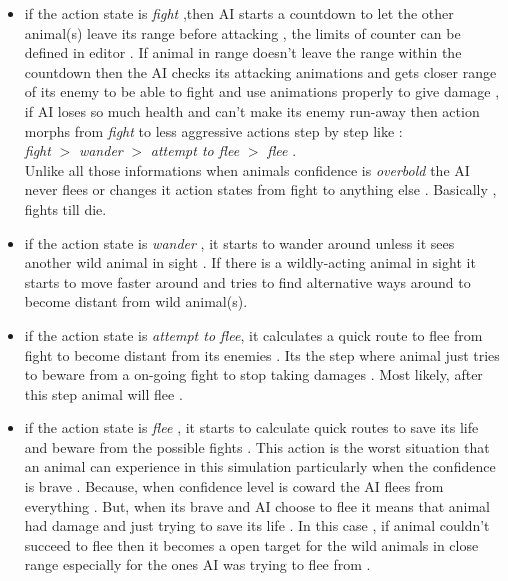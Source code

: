 \begin{itemize}
    \item if the action state is \textit{fight} ,then AI starts a countdown to let the other animal(s) leave its range before attacking , the limits of counter can be defined in editor  . If animal in range doesn't leave the range within the countdown then the AI checks its attacking animations and gets closer range of its enemy to be able to fight and use  animations properly to give damage , if AI loses so much health and can't make its enemy run-away then action morphs from \textit{fight} to less aggressive actions step by step like :\\
    
    \textit{fight} $>$   \textit{wander}  $>$ \textit{attempt to flee} $>$  \textit{flee} .\\
    
    
    Unlike all those informations when animals confidence is \textit{overbold} the AI never flees or changes it action states from fight to anything else . Basically ,  fights till die. \\
    
    \item if the action state is \textit{wander} , it starts to wander around unless it sees another wild animal in sight
    . If there is a wildly-acting animal in sight it starts to move faster around and tries to find alternative ways around to become distant from wild animal(s).\\
    
    \item if the action state is \textit{attempt to flee}, it calculates a quick route to flee from fight to become distant from its enemies . Its the step where animal just tries to beware from a on-going fight to stop taking damages . Most likely, after this step animal will flee .\\
    
    \item if the action state is \textit{flee} , it starts to calculate quick routes to save its life and beware from the possible fights . This action is the worst situation that an animal can experience in this simulation particularly when the confidence is brave . Because, when confidence level is coward the AI flees from everything . But, when its brave and AI choose to flee it means that animal had damage and just trying to save its life . In this case , if animal couldn't succeed to flee then it becomes a open target for the wild animals in close range especially for the ones AI was trying to flee from .
    
    
\end{itemize}


